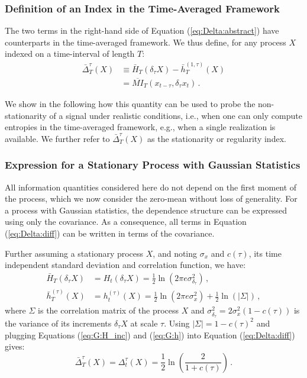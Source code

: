 \documentclass[aps,pra,groupedaddress,notitlepage]{revtex4-1}
\begin{document}
\subsubsection{Definition of an Index in the Time-Averaged Framework}

The two terms in the right-hand side of Equation (\ref{eq:Delta:abstract}) have counterparts in the time-averaged framework.
We thus define, for any process $X$ indexed on a time-interval of length $T$:
%
\begin{subequations}
\begin{align}
\bar{\Delta}_T^{\tau}(X) &\equiv \bar{H}_T(\delta_\tau X) - \bar{h}_T^{(1,\tau)}(X) \label{eq:Delta:diff} \\
&= \overline{MI}_T( x_{t-\tau}, \delta_\tau x_t) \label{eq:Delta:MI}\,.
\end{align}
\end{subequations}

%
We show in the following how this quantity can be used to probe the non-stationarity of a signal under realistic conditions, {i.e.}, when one can only compute entropies in the time-averaged framework, e.g., when a single realization is available.
We further refer to $\bar{\Delta}_T^{\tau}(X)$ as the stationarity or regularity index.

\subsubsection{Expression for a Stationary Process with Gaussian Statistics}
\label{sec:stationary:Gaussian}

All information quantities considered here do not depend on the first moment of the process, which we now consider the zero-mean without loss of generality.
For a process with Gaussian statistics, the dependence structure can be expressed using only the covariance.
As a consequence, all terms in Equation (\ref{eq:Delta:diff}) can be written in terms of the covariance.

Further assuming a stationary process $X$, and noting $\sigma_x$ and $c(\tau)$, its time independent standard deviation and correlation function, we have:
\begin{align}
\bar{H}_T(\delta_\tau X) &= H_t(\delta_\tau X)=\frac{1}{2}\ln(2 \pi e \sigma_{\delta_{\tau}}^2) \,, \label{eq:G:H_inc} \\
\bar{h}_T^{(\tau)}(X) &= h_t^{(\tau)}(X) =\frac{1}{2}\ln(2 \pi e \sigma_{x}^2)+\frac{1}{2}\ln \left(|\Sigma|\right) \,, \label{eq:G:h}
\end{align}
%
where $\Sigma$ is the correlation matrix of the process $X$ and $\sigma_{\delta_\tau}^2=2\sigma_x^2(1-c(\tau))$ is the variance of its increments $\delta_\tau X$ at scale $\tau$. Using $|\Sigma|=1-c(\tau)^2$ and plugging Equations (\ref{eq:G:H_inc}) and (\ref{eq:G:h}) into Equation (\ref{eq:Delta:diff}) gives:
\begin{equation}
\bar{\Delta}_T^{\tau}(X)={\Delta}_t^{\tau}(X) = \frac{1}{2}\ln\left(\frac{2}{1+c(\tau)}\right) \,. 
\label{eq:G:Delta}
\end{equation}
\end{document}
